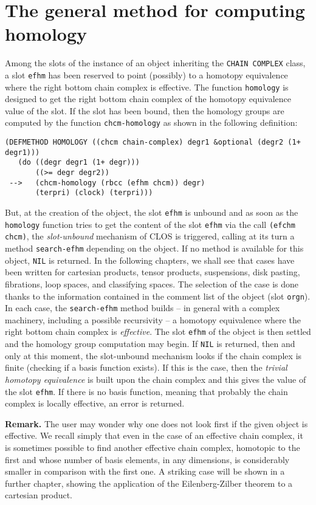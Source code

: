\section {The general method for computing homology}

Among the slots of the instance of an  object 
inheriting the {\tt CHAIN COMPLEX} class, a slot {\tt efhm}
has been reserved to point (possibly) to a homotopy e\-qui\-va\-len\-ce where the right bottom
chain complex is effective. The function {\tt homology} is designed to get
the right bottom chain complex of the homotopy equivalence value of the slot. If the
slot has been bound, then the homology groups are computed by the function {\tt chcm-homology}
as shown in the following de\-fi\-ni\-ti\-on:
{\footnotesize\begin{verbatim}
(DEFMETHOD HOMOLOGY ((chcm chain-complex) degr1 &optional (degr2 (1+ degr1)))
   (do ((degr degr1 (1+ degr)))
       ((>= degr degr2))
 -->   (chcm-homology (rbcc (efhm chcm)) degr)
       (terpri) (clock) (terpri)))
\end{verbatim}}
But, at the creation of the object, the slot {\tt efhm} is  unbound and as soon as the {\tt homology}
function tries to get the content of the slot {\tt efhm} via the call {\tt (efchm chcm)}, the
{\em slot-unbound} mechanism of CLOS is triggered, calling at its turn a method
{\tt search-efhm} depending on the object. If no method is available for this object,
{\tt NIL} is returned. In the following chapters, we shall see that cases have been
written for cartesian products, tensor products, suspensions, disk pasting, fibrations, 
loop spaces, and classifying spaces. The selection of the case is done thanks to the information 
contained in the comment list of the object (slot {\tt orgn}).
In each case,  the {\tt search-efhm} method builds -- in general with a complex machinery, including a possible
recursivity --
a homotopy equivalence where the right bottom
chain complex is {\em effective}. The slot {\tt efhm} of the object is then settled and the homology group
computation may begin. If {\tt NIL} is returned, then  and only at this moment, the slot-unbound
mechanism looks if the chain complex is finite (checking if a basis function exists). If this is the case, then
the {\em trivial homotopy equivalence} is built upon the chain complex and this gives the value of the slot
{\tt efhm}. If there is no basis function,  meaning that probably the chain complex is locally
effective, an error is returned.
\par
{\bf Remark.} The user may wonder why one does not  look first if the given object is effective.
We recall simply that even in the case of an effective chain complex, it is sometimes
possible to find another effective chain complex, homotopic to the first and whose 
number of basis elements, in any dimensions, is considerably smaller in comparison with the first one.
A striking case will be shown in a further chapter, showing the application of the
Eilenberg-Zilber theorem to a cartesian product.

